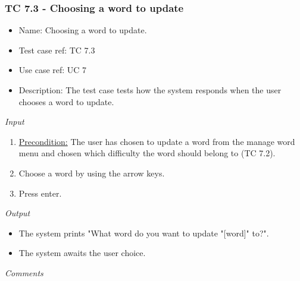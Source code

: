 \documentclass[12pt, letterpaper]{article}
\begin{document}
\subsubsection{TC 7.3 - Choosing a word to update}
\begin{itemize}
	\item Name: Choosing a word to update.
	\item Test case ref: TC 7.3
	\item Use case ref: UC 7
	\item Description: The test case tests how the system responds when the user chooses a word to update.
\end{itemize}
\emph{Input}
\begin{enumerate}
	\item \underline{Precondition:} The user has chosen to update a word from the manage word menu and chosen which difficulty the word should belong to (TC 7.2).
	\item Choose a word by using the arrow keys.
	\item Press enter.
\end{enumerate}
\emph{Output}
\begin{itemize}
	\item The system prints "What word do you want to update "[word]" to?".
	\item The system awaits the user choice.
\end{itemize}
\begin{Form}
	\newline
	\newline
\end{Form}
\newline
\emph{Comments}
\newline
\newline
\newline
\newline
\newline
\newline
\newline
\end{document}
